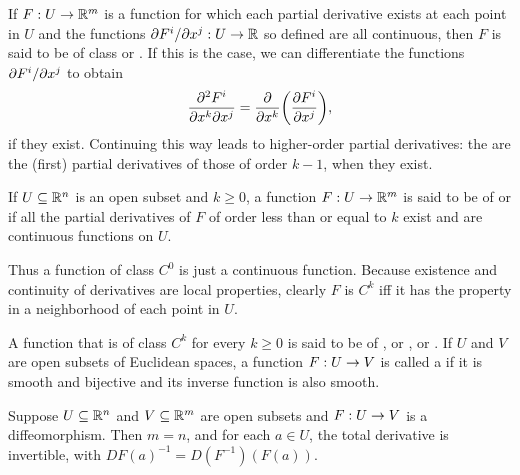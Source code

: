 \documentclass[11pt,a4paper]{article}
\begin{document}
\begin{definition}
If $F:U\rightarrow \mathbb{R}^m$ is a function for which each partial derivative exists at each point in $U$ and the functions $\partial F^i/\partial x^{j}:U\rightarrow \mathbb{R}$ so defined are all continuous, then $F$ is said to be of class  or . If this is the case, we can differentiate the functions $\partial F^i/\partial x^{j}$ to obtain 
\begin{equation*}
\dfrac{\partial^2 F^i}{\partial x^k \partial x^j} = \dfrac{\partial}{\partial x^{k}}\bigg(\dfrac{\partial F^i}{\partial x^{j}}\bigg),
\end{equation*}
if they exist. Continuing this way leads to higher-order partial derivatives: the  are the (first) partial derivatives of those of order $k-1$, when they exist.
\end{definition}

\begin{definition}
If $U\subseteq \mathbb{R}^n$ is an open subset and $k\ge 0$, a function $F:U\rightarrow \mathbb{R}^m$ is said to be of  or  if all the partial derivatives of $F$ of order less than or equal to $k$ exist and are continuous functions on $U$.
\end{definition}

\begin{remark}
Thus a function of class $C^0$ is just a continuous function. Because existence and continuity of derivatives are local properties, clearly $F$ is $C^k$ iff it has the property in a neighborhood of each point in $U$.
\end{remark}

\begin{definition}
A function that is of class $C^k$ for every $k\ge 0$ is said to be of , or , or . If $U$ and $V$ are open subsets of Euclidean spaces, a function $F:U\rightarrow V$ is called a  if it is smooth and bijective and its inverse function is also smooth.
\end{definition}

\begin{proposition}\label{prop:total_derivative_of_inverse}
Suppose $U\subseteq \mathbb{R}^n$ and $V\subseteq \mathbb{R}^m$ are open subsets and $F:U\rightarrow V$ is a diffeomorphism. Then $m = n$, and for each $a\in U$, the total derivative is invertible, with $DF(a)^{-1} = D(F^{-1})(F(a))$.
\end{proposition}
\end{document}
